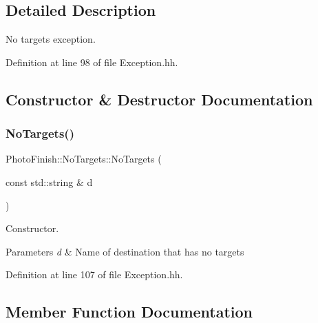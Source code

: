 \subsection{Detailed Description}
No targets exception. 

Definition at line 98 of file Exception.\+hh.



\subsection{Constructor \& Destructor Documentation}
\mbox{\label{class_photo_finish_1_1_no_targets_ab8e2b13061522bfa468d8df4dec41bf5}} 
\subsubsection{\texorpdfstring{No\+Targets()}{NoTargets()}}
{\footnotesize\ttfamily Photo\+Finish\+::\+No\+Targets\+::\+No\+Targets (\begin{DoxyParamCaption}\item[{const std\+::string \&}]{d }\end{DoxyParamCaption})\hspace{0.3cm}{\ttfamily [inline]}}



Constructor. 


\begin{DoxyParams}{Parameters}
{\em d} & Name of destination that has no targets \\
\hline
\end{DoxyParams}


Definition at line 107 of file Exception.\+hh.



\subsection{Member Function Documentation}
\mbox{\label{class_photo_finish_1_1_no_targets_a088b29651f950749ed274585c8d59956}} 
